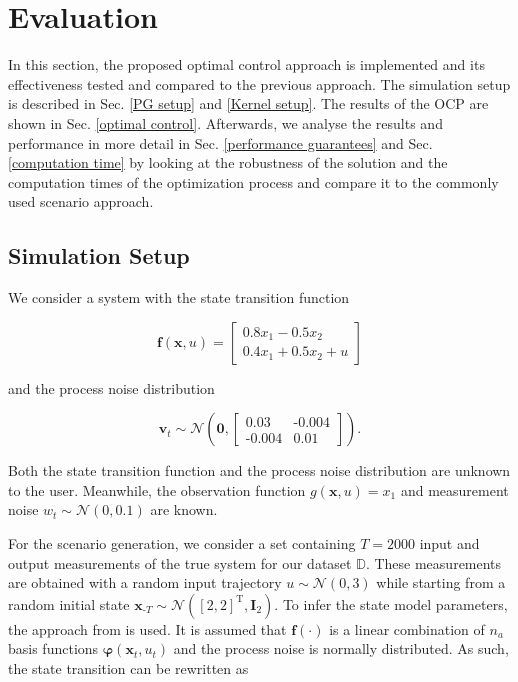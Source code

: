 \chapter{Evaluation}

In this section, the proposed optimal control approach is implemented and its effectiveness tested and compared to the previous approach. The simulation setup is described in Sec. \ref{PG setup} and \ref{Kernel setup}. The results of the OCP are shown in Sec. \ref{optimal control}. Afterwards, we analyse the results and performance in more detail in Sec. \ref{performance guarantees} and Sec. \ref{computation time} by looking at the robustness of the solution and the computation times of the optimization process and compare it to the commonly used scenario approach.

\section{Simulation Setup} \label{Setup}

We consider a system with the state transition function

\begin{equation}
\boldsymbol{f}(\boldsymbol{x}, u) = 
\begin{bmatrix}
0.8  x_1 - 0.5 x_2 \\
0.4 x_1 + 0.5 x_2 + u
\end{bmatrix}
\end{equation}

and the process noise distribution

\begin{equation}
\boldsymbol{v}_t \sim \mathcal{N} \left(\boldsymbol{0}, 
\begin{bmatrix}
0.03 & \text{-}0.004 \\
\text{-}0.004 & 0.01
\end{bmatrix}
\right).
\end{equation}

Both the state transition function and the process noise distribution are unknown to the user. Meanwhile, the observation function $g(\boldsymbol{x}, u) = x_1$ and measurement noise $w_t \sim \mathcal{N} (0, 0.1)$ are known. 


For the scenario generation, we consider a set containing $T = 2000$ input and output measurements of the true system for our dataset $\mathbb{D}$. These measurements are obtained with a random input trajectory $u \sim \mathcal{N} (0, 3)$ while starting from a random initial state $\boldsymbol{x}_{\text{-}T} \sim \mathcal{N} ([2, 2]^\text{T}, \boldsymbol{I}_2)$. To infer the state model parameters, the approach from \cite{Svensson_17} is used. It is assumed that $\boldsymbol{f}(\cdot)$ is a linear combination of $n_a$ basis functions $\boldsymbol{\varphi}(\boldsymbol{x}_t, u_t)$ and the process noise is normally distributed. As such, the state transition can be rewritten as

